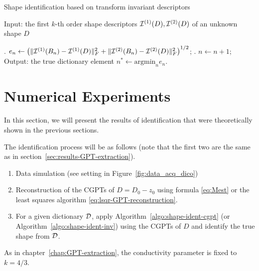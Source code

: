 \begin{algorithm}
  \caption{Shape identification based on transform invariant descriptors}
  \label{algo:shape-ident-inv}
  \begin{algorithmic}
    \STATE Input: the first $k$-th order shape descriptors $\mathcal{I}^{(1)}(D), \mathcal{I}^{(2)}(D)$ of an unknown shape $D$

    .
    $e_n\leftarrow \left(\mathopen\| \mathcal{I}^{(1)}(B_n) - \mathcal{I}^{(1)}(D) \mathclose\|_F^2 + \mathopen\| \mathcal{I}^{(2)}(B_n) -
    \mathcal{I}^{(2)}(D) \mathclose\|_F^2\right)^{1/2}$;
    . $n\leftarrow n+1$;
    \ENDFOR
    \STATE Output: the true dictionary element $n^*\leftarrow \mbox{argmin}_n
    e_n$.
  \end{algorithmic}
\end{algorithm}


\section{Numerical Experiments} \label{sec:numer-exper}

In this section, we will present the results of identification that were
theoretically shown in the previous sections. 

The identification process will be as follows (note that the first two are the
same as in section~\ref{sec:results-GPT-extraction}).
\begin{enumerate}
\item Data simulation (see setting in Figure~\ref{fig:data_acq_dico})
\item Reconstruction of the CGPTs of $D=D_0-z_0$ using formula
  \eqref{eq:Mest} or the least squares algorithm \eqref{eq:lsqr-GPT-reconstruction}.
\item For a given dictionary ${\mathcal{D}}$, apply
  Algorithm~\ref{algo:shape-ident-cgpt} (or
  Algorithm~\ref{algo:shape-ident-inv}) using the CGPTs of $D$ and
  identify the true shape from ${\mathcal{D}}$.
\end{enumerate}
As in chapter~\ref{chap:GPT-extraction}, the conductivity parameter
is fixed to $k=4/3$. 

